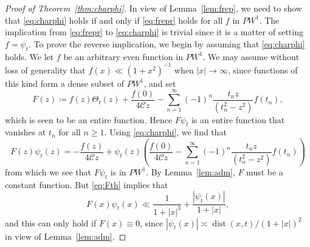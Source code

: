 \documentclass[12pt]{amsart}
\theoremstyle{plain}
\numberwithin{equation}{section}
\theoremstyle{definition}
\newcommand{\Cone}{\mathscr{C}}
\begin{document}
\begin{proof}[Proof of Theorem~\ref{thm:charphi}]
In view of Lemma~\ref{lem:frep}, we need to show that \eqref{eq:charphi} holds if and only if \eqref{eq:frepr} holds for all $f$ in $PW^1$. The implication from \eqref{eq:frepr} to  \eqref{eq:charphi} is trivial since it is a matter of setting $f=\psi_t$. To prove the reverse implication, we begin by assuming that \eqref{eq:charphi} holds. We let $f$ be an arbitrary even function in $PW^1$.
We may assume without loss of generality that $f(x)\ll (1+x^2)^{-1}$ when $|x|\to \infty$, since functions of this kind form a dense subset of $PW^1$, and set
\[ F(z)\coloneqq f(z)\Theta_t(z)+\frac{f(0)}{4\Cone z}-\sum_{n=1}^\infty (-1)^n \frac{t_n z}{(t_n^2-z^2)} f(t_n), \]
which is seen to be an entire function. Hence $F\psi_t$ is an entire function that vanishes at $t_n$ for all $n\ge1$. Using \eqref{eq:charphi}, we find that
\begin{equation} \label{eq:Fth} F(z) \psi_t (z) = -\frac{f(z)}{4\Cone z}+\psi_t(z)\left(\frac{f(0)}{4\Cone z}-\sum_{n=1}^\infty (-1)^n \frac{t_n z}{(t_n^2-z^2)} f(t_n)\right) \end{equation}
from which we see that $F\psi_t$ is in $PW^1$. By Lemma~\ref{lem:adm}, $F$ must be a constant function. But \eqref{eq:Fth} implies that
\[ F(x)\psi_t(x) \ll \frac{1}{1+|x|^3} + \frac{|\psi_t(x)|}{1+|x|}, \]
and this can only hold if $F(x)\equiv 0$, since $|\psi_t(x)| \asymp \operatorname{dist}(x,t)/(1+|x|)^2$ in view of Lemma~\ref{lem:adm}.
  \end{proof}
\end{document}
